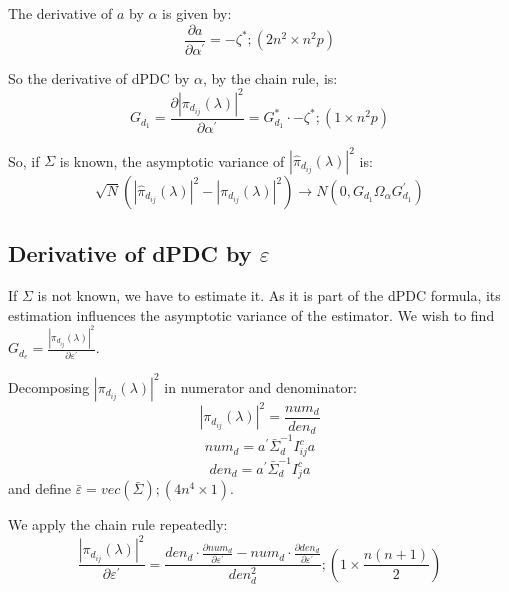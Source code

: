 \documentclass[a4paper,10pt]{article}
\begin{document}
The derivative of $a$ by $\alpha$ is given by:
\begin{equation}
\frac{\partial a}{\partial \alpha^{'}} = -\zeta^{\ast}; (2n^{2} \times n^{2}p)
\end{equation}

So the derivative of dPDC by $\alpha$, by the chain rule, is:
\begin{equation}
G_{d_1} = \frac{\partial |\pi_{d_{ij}}(\lambda)|^{2}}{\partial \alpha^{'}} = G_{d_1}^{\ast} \cdot -\zeta^{\ast}; (1 \times n^{2}p)
\end{equation}

So, if $\Sigma$ is known, the asymptotic variance of $|\hat{\pi}_{d_{ij}}(\lambda)|^{2}$ is:
\begin{equation}
\sqrt{N} (|\hat{\pi}_{d_{ij}}(\lambda)|^{2} - |\pi_{d_{ij}}(\lambda)|^{2}) \to N(0, G_{d_1} \Omega_{\alpha} G_{d_1}^{'}) 
\end{equation}

\subsection{Derivative of dPDC by $\varepsilon$}

If $\Sigma$ is not known, we have to estimate it. As it is part of the dPDC formula, its estimation influences the asymptotic variance of the estimator. We wish to find  $G_{d_e} = \frac{|\pi_{d_{ij}}(\lambda)|^{2}}{\partial \varepsilon^{'}}$.

Decomposing $|\pi_{d_{ij}}(\lambda)|^{2}$ in numerator and denominator:
\begin{equation}
|\pi_{d_{ij}}(\lambda)|^{2} = \frac{num_{d}}{den_{d}}
\end{equation}
\begin{equation}
num_{d} = a^{'} \bar{\Sigma}_{d}^{-1} I_{ij}^{c} a
\end{equation}
\begin{equation}
den_{d} = a^{'} \bar{\Sigma}_{d}^{-1} I_{j}^{c} a
\end{equation}
and define $\bar{\varepsilon} = vec(\bar{\Sigma}); (4n^{4} \times 1)$.

We apply the chain rule repeatedly:
\begin{equation}
\frac{|\pi_{d_{ij}}(\lambda)|^{2}}{\partial \varepsilon^{'}} = \frac{den_{d} \cdot \frac{\partial num_{d}}{\partial \varepsilon^{'}} - num_{d} \cdot \frac{\partial den_{d}}{\partial \varepsilon^{'}}}{den_{d}^{2}}; (1 \times \frac{n(n+1)}{2})
\end{equation}
\end{document}
